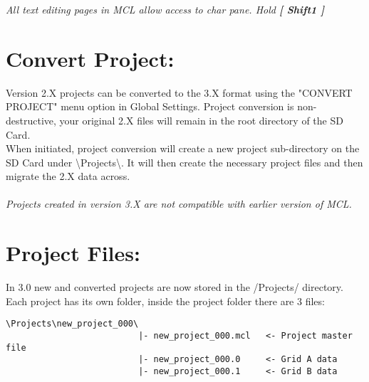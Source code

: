 \textit{All text editing pages in MCL allow access to char pane. Hold \textbf{[ Shift1 ]}}

\section{Convert Project:}
Version 2.X projects can be converted to the 3.X format using the "CONVERT PROJECT"
menu option in Global Settings. Project conversion is non-destructive, your original 2.X
files will remain in the root directory of the SD Card.\\

When initiated, project conversion will create a new project sub-directory on the SD Card under \textbackslash Projects\textbackslash. It will then create the necessary project files and then migrate the 2.X data across.\\\\
\textit{Projects created in version 3.X are not compatible with earlier version of MCL.}
\section{Project Files:}
In 3.0 new and converted projects are now stored in the /Projects/ directory.
Each project has its own folder, inside the project folder there are 3 files:
\begin{verbatim}
\Projects\new_project_000\
                          |- new_project_000.mcl   <- Project master file
                          |- new_project_000.0     <- Grid A data
                          |- new_project_000.1     <- Grid B data
\end{verbatim}